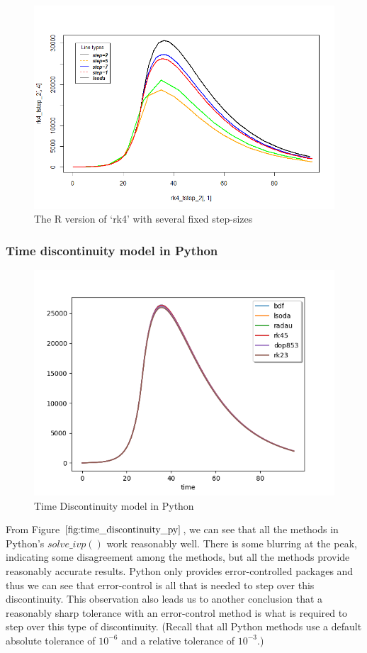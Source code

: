 \begin{figure}[h]
\centering
\includegraphics[width=0.7\linewidth]{./figures/rk4_messing_up_no_event_R}
\caption{The R version of `rk4' with several fixed step-sizes}
\label{fig:rk4_messing_up_no_event_R}
\end{figure}


\subsubsection{Time discontinuity model in Python}
\begin{figure}[h]
\centering
\includegraphics[width=0.7\linewidth]{./figures/time_discontinuity_py}
\caption{Time Discontinuity model in Python}
\label{fig:time_discontinuity_py}
\end{figure}
From Figure $\ref{fig:time_discontinuity_py}$, we can see that all the methods in Python's $solve\_ivp()$ work reasonably well. There is some blurring at the peak, indicating some disagreement among the methods, but all the methods provide reasonably accurate results. Python only provides error-controlled packages and thus we can see that error-control is all that is needed to step over this discontinuity. This observation also leads us to another conclusion that a reasonably sharp tolerance with an error-control method is what is required to step over this type of discontinuity. (Recall that all Python methods use a default absolute tolerance of $10^{-6}$ and a relative tolerance of $10^{-3}$.)

